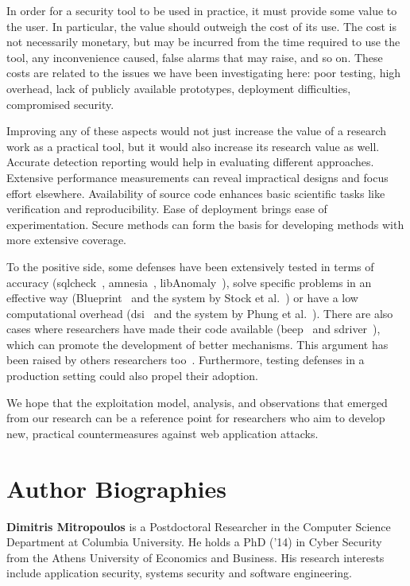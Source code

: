 \documentclass[10pt,journal,compsoc]{IEEEtran}
\begin{document}
In order for a security tool to be used in practice, it must provide
some value to the user. In particular, the value should outweigh the
cost of its use. The cost is not necessarily monetary, but may be
incurred from the time required to use the tool, any inconvenience
caused, false alarms that may raise, and so on. These costs are related to the
issues we have been investigating here: poor testing, high overhead,
lack of publicly available prototypes,
deployment difficulties, compromised security. 

Improving any of these aspects would not just increase the value of a 
research work as a practical tool, but it would also increase its
research value as well.
Accurate detection reporting would help in evaluating different
approaches. Extensive performance measurements can reveal impractical
designs and focus effort elsewhere. Availability of source code
enhances basic scientific tasks like verification and reproducibility. Ease of
deployment brings ease of experimentation. Secure methods can form the
basis for developing methods with more extensive coverage.

To the positive side, some defenses have been extensively tested in
terms of accuracy ({\sc sqlc}heck~\cite{SW06},
{\sc amnesia}~\cite{HO05b}, libAnomaly~\cite{VMV05}),
solve specific problems in an effective way
(Blueprint~\cite{LV09} and the system by Stock et al.~\cite{SLMS14}) or
have a low computational overhead
({\sc dsi}~\cite{NSS06} and the system by Phung et al.~\cite{PSC09}).
There are also cases where
researchers have made their code available ({\sc beep}~\cite{TNH07}
and {\sc sd}river~\cite{MS09}),
which can promote the development of better
mechanisms. This argument has been raised by others
researchers too~\cite{SPWS13}.
Furthermore, testing defenses in a production
setting could also propel their adoption.

We hope that the exploitation model, analysis, and observations that
emerged from our research can be a reference point for researchers who
aim to develop new, practical countermeasures against web application
attacks.




\section*{Author Biographies}
\noindent
{\bf Dimitris Mitropoulos} is a Postdoctoral Researcher
in the Computer Science Department
at Columbia University.
He holds a PhD ('14) in Cyber Security from the
Athens University of Economics and Business.
His research interests include application security,
systems security and software engineering.
\end{document}
